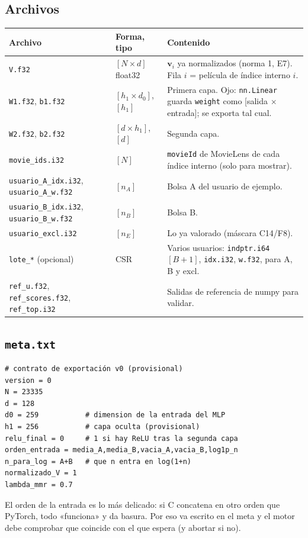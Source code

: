 \documentclass[a4paper,11pt]{article}
\newcommand{\cod}[1]{\texttt{#1}}
\begin{document}
\subsection{Archivos}
\begin{center}
\begin{tabularx}{\linewidth}{llY}
\toprule
Archivo & Forma, tipo & Contenido \\
\midrule
\cod{V.f32} & $[N\times d]$ float32 & $\mathbf{v}_i$ ya normalizados (norma 1, E7). Fila $i$ = película de índice interno $i$. \\
\cod{W1.f32}, \cod{b1.f32} & $[h_1\times d_0]$, $[h_1]$ & Primera capa. Ojo: \cod{nn.Linear} guarda \cod{weight} como [salida $\times$ entrada]; se exporta tal cual. \\
\cod{W2.f32}, \cod{b2.f32} & $[d\times h_1]$, $[d]$ & Segunda capa. \\
\cod{movie\_ids.i32} & $[N]$ & \cod{movieId} de MovieLens de cada índice interno (solo para mostrar). \\
\cod{usuario\_A\_idx.i32}, \cod{usuario\_A\_w.f32} & $[n_A]$ & Bolsa A del usuario de ejemplo. \\
\cod{usuario\_B\_idx.i32}, \cod{usuario\_B\_w.f32} & $[n_B]$ & Bolsa B. \\
\cod{usuario\_excl.i32} & $[n_E]$ & Lo ya valorado (máscara C14/F8). \\
\cod{lote\_*} (opcional) & CSR & Varios usuarios: \cod{indptr.i64} $[B+1]$, \cod{idx.i32}, \cod{w.f32}, para A, B y excl. \\
\cod{ref\_u.f32}, \cod{ref\_scores.f32}, \cod{ref\_top.i32} & & Salidas de referencia de numpy para validar. \\
\bottomrule
\end{tabularx}
\end{center}

\subsection{\texttt{meta.txt}}
\begin{lstlisting}
# contrato de exportación v0 (provisional)
version = 0
N = 23335
d = 128
d0 = 259           # dimension de la entrada del MLP
h1 = 256           # capa oculta (provisional)
relu_final = 0     # 1 si hay ReLU tras la segunda capa
orden_entrada = media_A,media_B,vacia_A,vacia_B,log1p_n
n_para_log = A+B   # que n entra en log(1+n)
normalizado_V = 1
lambda_mmr = 0.7
\end{lstlisting}
El orden de la entrada es lo más delicado: si C concatena en otro orden que PyTorch, todo «funciona» y da basura.
Por eso va escrito en el meta y el motor debe comprobar que coincide con el que espera (y abortar si no).
\end{document}
